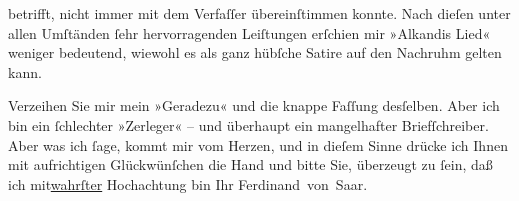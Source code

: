                betrifft, nicht immer mit dem Verfaſſer übereinſtimmen konnte. Nach dieſen unter
               allen Umſtänden{ }ſehr hervorragenden Leiſtungen erſchien mir »Alkandis Lied« weniger bedeutend, wiewohl es als ganz hübſche
               Satire auf den Nachruhm gelten kann.\pend
           
\pstart
           Verzeihen Sie mir mein »Geradezu« und die knappe Faſſung desſelben. Aber ich bin {\pb}ein{ }ſchlechter »Zerleger« – und überhaupt ein
               mangelhafter Briefſchreiber. Aber was ich{ }ſage, kommt mir vom Herzen, und in dieſem
               Sinne drücke ich Ihnen mit aufrichtigen Glückwünſchen die Hand und bitte Sie,
               überzeugt zu{ }ſein, daß ich \introOben{}mit\introOben{}{ }\uline{wahrſter} Hochachtung bin\pend
           \pstart Ihr \spacefill\mbox{Ferdinand von Saar.}\pend{}\endnumbering{}  \newcommand{\dateiname}{L00296}\newcommand{\titel}{Ferdinand von Saar an Arthur Schnitzler, 5. 2. 1894}\newcommand{\editorInnen}{Martin Anton Müller und Gerd-Hermann Susen}
